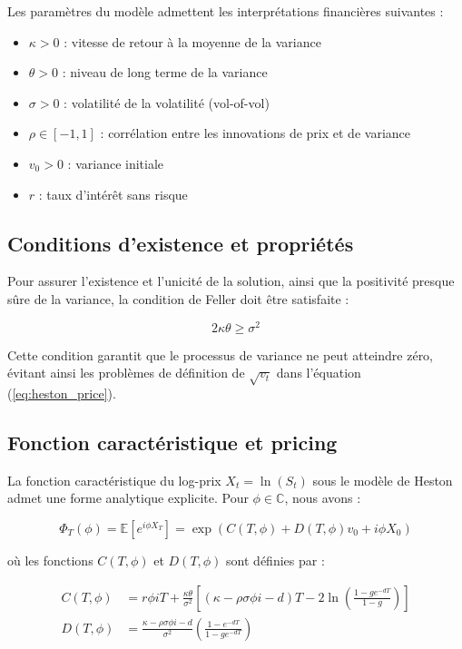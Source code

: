 Les paramètres du modèle admettent les interprétations financières suivantes :

\begin{itemize}
\item $\kappa > 0$ : vitesse de retour à la moyenne de la variance
\item $\theta > 0$ : niveau de long terme de la variance
\item $\sigma > 0$ : volatilité de la volatilité (vol-of-vol)
\item $\rho \in [-1,1]$ : corrélation entre les innovations de prix et de variance
\item $v_0 > 0$ : variance initiale
\item $r$ : taux d'intérêt sans risque
\end{itemize}

\subsection{Conditions d'existence et propriétés}

Pour assurer l'existence et l'unicité de la solution, ainsi que la positivité presque sûre de la variance, la condition de Feller doit être satisfaite :

\begin{equation}
2\kappa\theta \geq \sigma^2 \label{eq:feller}
\end{equation}

Cette condition garantit que le processus de variance ne peut atteindre zéro, évitant ainsi les problèmes de définition de $\sqrt{v_t}$ dans l'équation (\ref{eq:heston_price}).

\subsection{Fonction caractéristique et pricing}

La fonction caractéristique du log-prix $X_t = \ln(S_t)$ sous le modèle de Heston admet une forme analytique explicite. Pour $\phi \in \mathbb{C}$, nous avons :

\begin{equation}
\Phi_T(\phi) = \mathbb{E}[e^{i\phi X_T}] = \exp(C(T,\phi) + D(T,\phi)v_0 + i\phi X_0)
\end{equation}

où les fonctions $C(T,\phi)$ et $D(T,\phi)$ sont définies par :

\begin{align}
C(T,\phi) &= r\phi iT + \frac{\kappa\theta}{\sigma^2}\left[(\kappa - \rho\sigma\phi i - d)T - 2\ln\left(\frac{1-ge^{-dT}}{1-g}\right)\right]\\
D(T,\phi) &= \frac{\kappa - \rho\sigma\phi i - d}{\sigma^2}\left(\frac{1-e^{-dT}}{1-ge^{-dT}}\right)
\end{align}


